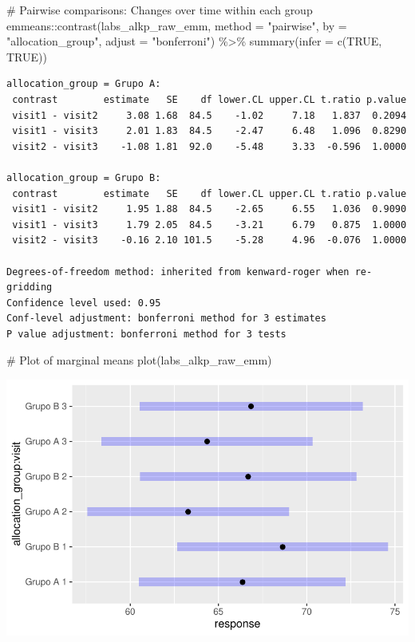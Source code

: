 \documentclass[
  12pt,
]{article}
\newenvironment{Shaded}{\begin{snugshade}}{\end{snugshade}}
\newcommand{\AttributeTok}[1]{\textcolor[rgb]{0.40,0.45,0.13}{#1}}
\newcommand{\CommentTok}[1]{\textcolor[rgb]{0.37,0.37,0.37}{#1}}
\newcommand{\ConstantTok}[1]{\textcolor[rgb]{0.56,0.35,0.01}{#1}}
\newcommand{\FunctionTok}[1]{\textcolor[rgb]{0.28,0.35,0.67}{#1}}
\newcommand{\NormalTok}[1]{\textcolor[rgb]{0.00,0.23,0.31}{#1}}
\newcommand{\SpecialCharTok}[1]{\textcolor[rgb]{0.37,0.37,0.37}{#1}}
\newcommand{\StringTok}[1]{\textcolor[rgb]{0.13,0.47,0.30}{#1}}
\begin{document}
\begin{Shaded}
\begin{Highlighting}[]
\CommentTok{\# Pairwise comparisons: Changes over time within each group}
\NormalTok{emmeans}\SpecialCharTok{::}\FunctionTok{contrast}\NormalTok{(labs\_alkp\_raw\_emm,}
\AttributeTok{method =} \StringTok{"pairwise"}\NormalTok{, }\AttributeTok{by =} \StringTok{"allocation\_group"}\NormalTok{,}
\AttributeTok{adjust =} \StringTok{"bonferroni"}\NormalTok{) }\SpecialCharTok{\%\textgreater{}\%} \FunctionTok{summary}\NormalTok{(}\AttributeTok{infer =} \FunctionTok{c}\NormalTok{(}\ConstantTok{TRUE}\NormalTok{, }\ConstantTok{TRUE}\NormalTok{))}
\end{Highlighting}
\end{Shaded}

\begin{verbatim}
allocation_group = Grupo A:
 contrast        estimate   SE    df lower.CL upper.CL t.ratio p.value
 visit1 - visit2     3.08 1.68  84.5    -1.02     7.18   1.837  0.2094
 visit1 - visit3     2.01 1.83  84.5    -2.47     6.48   1.096  0.8290
 visit2 - visit3    -1.08 1.81  92.0    -5.48     3.33  -0.596  1.0000

allocation_group = Grupo B:
 contrast        estimate   SE    df lower.CL upper.CL t.ratio p.value
 visit1 - visit2     1.95 1.88  84.5    -2.65     6.55   1.036  0.9090
 visit1 - visit3     1.79 2.05  84.5    -3.21     6.79   0.875  1.0000
 visit2 - visit3    -0.16 2.10 101.5    -5.28     4.96  -0.076  1.0000

Degrees-of-freedom method: inherited from kenward-roger when re-gridding 
Confidence level used: 0.95 
Conf-level adjustment: bonferroni method for 3 estimates 
P value adjustment: bonferroni method for 3 tests 
\end{verbatim}

\begin{Shaded}
\begin{Highlighting}[]
\CommentTok{\# Plot of marginal means}
\FunctionTok{plot}\NormalTok{(labs\_alkp\_raw\_emm)}
\end{Highlighting}
\end{Shaded}

\includegraphics{Outcomes_files/figure-pdf/labs_alkp_raw_emm-1.pdf}
\end{document}
